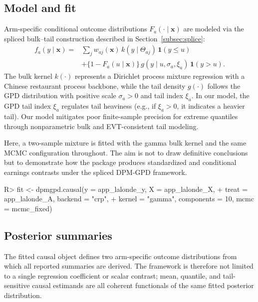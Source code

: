\documentclass[preprint,12pt,authoryear]{elsarticle}
\renewenvironment{Schunk}{\vspace{0pt}}{\vspace{-0.1\baselineskip}}
\begin{document}
\subsection{Model and fit}

Arm-specific conditional outcome distributions
$F_a(\cdot\mid \boldsymbol{x})$ are modeled via the spliced bulk--tail
construction described in Section~\ref{subsec:splice}:
\begin{equation*}
\begin{aligned}
f_a(y\mid \boldsymbol{x})
={}&
\sum_j w_{aj}(\boldsymbol{x})\, k(y\mid \Theta_{aj})\,\mathbf{1}(y\le u)\\
&+
\{1-F_a(u\mid \boldsymbol{x})\}\, g(y\mid u,\sigma_a,\xi_a)\,\mathbf{1}(y>u).
\end{aligned}
\end{equation*}
The bulk kernel $k(\cdot)$ represents a Dirichlet process mixture
regression with a Chinese restaurant process backbone, while the tail
density $g(\cdot)$ follows the GPD distribution with positive scale
$\sigma_a>0$ and tail index $\xi_a$. In our model, the GPD tail index
$\xi_a$ regulates tail heaviness (e.g., if $\xi_a>0$, it indicates a
heavier tail). Our model mitigates poor finite-sample precision for extreme
quantiles through nonparametric bulk and EVT-consistent tail modeling.

Here, a two-sample mixture is fitted with the gamma bulk kernel and the
same MCMC configuration throughout. The aim is not to draw definitive
conclusions but to demonstrate how the package produces standardized and
conditional earnings contrasts under the spliced DPM-GPD framework.

\begin{Schunk}
\begin{Sinput}
R> fit <- dpmgpd.causal(y = app_lalonde_y, X = app_lalonde_X,
+                       treat = app_lalonde_A,  backend = "crp",
+                       kernel = "gamma", components = 10,  mcmc = mcmc_fixed)
\end{Sinput}
\end{Schunk}



\subsection{Posterior summaries}

The fitted causal object defines two arm-specific outcome distributions
from which all reported summaries are derived. The framework is therefore
not limited to a single regression coefficient or scalar contrast; mean,
quantile, and tail-sensitive causal estimands are all coherent functionals
of the same fitted posterior distribution.
\end{document}
